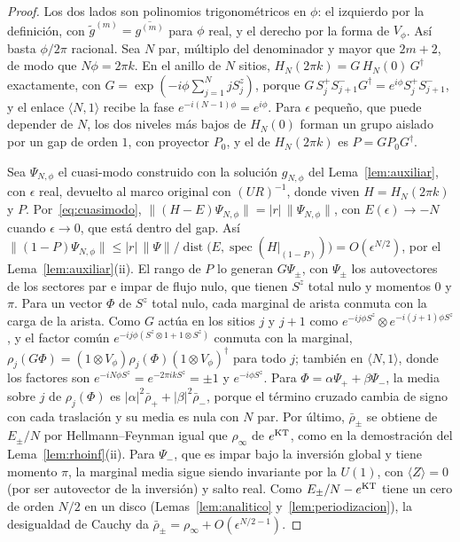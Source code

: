 \documentclass[11pt,a4paper]{article}
\theoremstyle{remark}
\newcommand{\ev}[1]{\langle #1\rangle}
\begin{document}
\begin{proof}
Los dos lados son polinomios trigonométricos en $\phi$: el izquierdo por la definición, con
$\tilde g^{(m)}=\overline{g^{(m)}}$ para $\phi$ real, y el derecho por la forma de $V_\phi$. Así basta
$\phi/2\pi$ racional. Sea $N$ par, múltiplo del denominador y mayor que $2m+2$, de modo que
$N\phi=2\pi k$. En el anillo de $N$ sitios,
$H_N(2\pi k)=G\,H_N(0)\,G^\dagger$ exactamente, con $G=\exp(-i\phi\sum_{j=1}^NjS^z_j)$, porque
$G\,S^+_jS^-_{j+1}G^\dagger=e^{i\phi}S^+_jS^-_{j+1}$, y el enlace $\langle N,1\rangle$ recibe la fase
$e^{-i(N-1)\phi}=e^{i\phi}$. Para $\epsilon$ pequeño, que puede depender de $N$,
los dos niveles más bajos de $H_N(0)$ forman un grupo aislado por un gap de orden $1$, con proyector
$P_0$, y el de $H_N(2\pi k)$ es $P=GP_0G^\dagger$.

Sea $\Psi_{N,\phi}$ el cuasi-modo construido con la solución $g_{N,\phi}$ del Lema~\ref{lem:auxiliar},
con $\epsilon$ real, devuelto al marco original con $(UR)^{-1}$, donde viven $H=H_N(2\pi k)$ y $P$. Por~\eqref{eq:cuasimodo}, $\|(H-E)\Psi_{N,\phi}\|=|r|\,\|\Psi_{N,\phi}\|$, con
$E(\epsilon)\to-N$ cuando $\epsilon\to0$, que está dentro del gap. Así
$\|(1-P)\Psi_{N,\phi}\|\le|r|\,\|\Psi\|/\operatorname{dist}\big(E,\operatorname{spec}(H|_{(1-P)})\big)=O(\epsilon^{N/2})$, por el
Lema~\ref{lem:auxiliar}(ii). El rango de $P$ lo generan $G\Psi_\pm$,
con $\Psi_\pm$ los autovectores de los sectores par e impar de flujo nulo, que tienen $S^z$ total nulo
y momentos $0$ y $\pi$. Para un vector $\Phi$ de $S^z$ total nulo, cada marginal de arista conmuta con
la carga de la arista. Como $G$ actúa en los sitios $j$ y $j{+}1$ como $e^{-ij\phi S^z}\otimes
e^{-i(j+1)\phi S^z}$, y el factor común $e^{-ij\phi(S^z\otimes1+1\otimes S^z)}$ conmuta con la marginal,
$\rho_j(G\Phi)=(1\otimes V_\phi)\rho_j(\Phi)(1\otimes V_\phi)^\dagger$ para todo $j$; también en
$\langle N,1\rangle$, donde los factores son $e^{-iN\phi S^z}=e^{-2\pi ikS^z}=\pm1$ y $e^{-i\phi S^z}$. Para $\Phi=\alpha\Psi_++\beta\Psi_-$, la media sobre
$j$ de $\rho_j(\Phi)$ es $|\alpha|^2\bar\rho_++|\beta|^2\bar\rho_-$, porque el término cruzado cambia de
signo con cada traslación y su media es nula con $N$ par. Por último, $\bar\rho_\pm$ se obtiene de
$E_\pm/N$ por Hellmann--Feynman igual que $\rho_\infty$ de $e^{\rm KT}$, como en la demostración del
Lema~\ref{lem:rhoinf}(ii). Para $\Psi_-$, que es impar bajo la inversión global y tiene momento $\pi$, la
marginal media sigue siendo invariante por la $U(1)$, con $\ev Z=0$ (por ser autovector de la
inversión) y salto real. Como $E_\pm/N-e^{\rm KT}$ tiene un cero de orden $N/2$ en un disco
(Lemas~\ref{lem:analitico} y~\ref{lem:periodizacion}), la desigualdad de Cauchy da
$\bar\rho_\pm=\rho_\infty+O(\epsilon^{N/2-1})$.


\end{proof}
\end{document}

